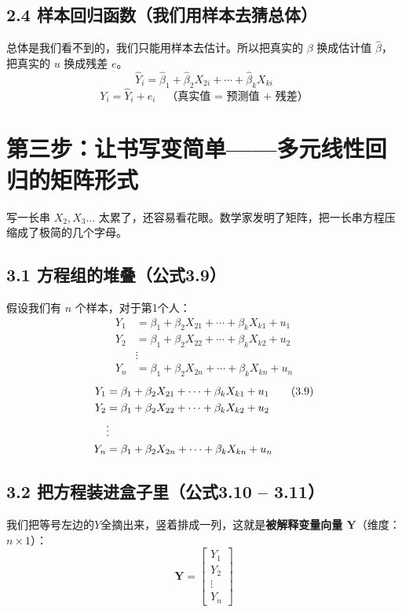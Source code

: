 \documentclass[12pt,a4paper]{ctexart}
\newcommand{\vect}[1]{\mathbf{#1}}
\begin{document}
\subsection*{2.4 样本回归函数（我们用样本去猜总体）}
总体是我们看不到的，我们只能用样本去估计。所以把真实的 \(\beta\) 换成估计值 \(\hat{\beta}\)，把真实的 \(u\) 换成残差 \(e\)。
\begin{equation*}
\hat{Y}_i = \hat{\beta}_1 + \hat{\beta}_2 X_{2i} + \cdots + \hat{\beta}_k X_{ki} \tag{3.7}
\end{equation*}
\begin{equation*}
Y_i = \hat{Y}_i + e_i \quad \text{（真实值 = 预测值 + 残差）} \tag{3.8}
\end{equation*}

\section*{第三步：让书写变简单——多元线性回归的矩阵形式}

写一长串 \(X_2, X_3\dots\) 太累了，还容易看花眼。数学家发明了矩阵，把一长串方程压缩成了极简的几个字母。

\subsection*{3.1 方程组的堆叠（公式3.9）}
假设我们有 \(n\) 个样本，对于第1个人：
\begin{align*}
Y_1 &= \beta_1 + \beta_2 X_{21} + \cdots + \beta_k X_{k1} + u_1 \\
Y_2 &= \beta_1 + \beta_2 X_{22} + \cdots + \beta_k X_{k2} + u_2 \\
&\vdots \\
Y_n &= \beta_1 + \beta_2 X_{2n} + \cdots + \beta_k X_{kn} + u_n
\end{align*}
\begin{align}
Y_1 &= \beta_1 + \beta_2 X_{21} + \cdots + \beta_k X_{k1} + u_1 \tag{3.9}\\
Y_2 &= \beta_1 + \beta_2 X_{22} + \cdots + \beta_k X_{k2} + u_2 \notag\\
&\vdots \notag\\
Y_n &= \beta_1 + \beta_2 X_{2n} + \cdots + \beta_k X_{kn} + u_n \notag
\end{align}

\subsection*{3.2 把方程装进盒子里（公式3.10 -- 3.11）}
我们把等号左边的\(Y\)全摘出来，竖着排成一列，这就是\textbf{被解释变量向量 \(\vect{Y}\)}（维度：\(n\times 1\)）：
\[
\vect{Y} = \begin{bmatrix} Y_1 \\ Y_2 \\ \vdots \\ Y_n \end{bmatrix}
\]
\end{document}
